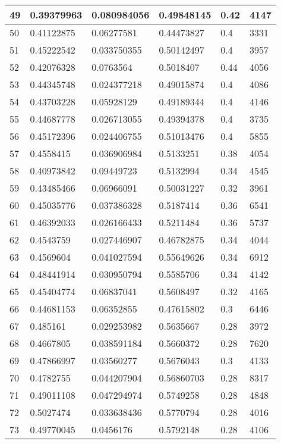 \begin{longtable}{|l|l|l|l|l|l|}
49 & 0.39379963 & 0.080984056 & 0.49848145 & 0.42 & 4147 \\ \hline 
50 & 0.41122875 & 0.06277581 & 0.44473827 & 0.4 & 3331 \\ \hline 
51 & 0.45222542 & 0.033750355 & 0.50142497 & 0.4 & 3957 \\ \hline 
52 & 0.42076328 & 0.0763564 & 0.5018407 & 0.44 & 4056 \\ \hline 
53 & 0.44345748 & 0.024377218 & 0.49015874 & 0.4 & 4086 \\ \hline 
54 & 0.43703228 & 0.05928129 & 0.49189344 & 0.4 & 4146 \\ \hline 
55 & 0.44687778 & 0.026713055 & 0.49394378 & 0.4 & 3735 \\ \hline 
56 & 0.45172396 & 0.024406755 & 0.51013476 & 0.4 & 5855 \\ \hline 
57 & 0.4558415 & 0.036906984 & 0.5133251 & 0.38 & 4054 \\ \hline 
58 & 0.40973842 & 0.09449723 & 0.5132994 & 0.34 & 4545 \\ \hline 
59 & 0.43485466 & 0.06966091 & 0.50031227 & 0.32 & 3961 \\ \hline 
60 & 0.45035776 & 0.037386328 & 0.5187414 & 0.36 & 6541 \\ \hline 
61 & 0.46392033 & 0.026166433 & 0.5211484 & 0.36 & 5737 \\ \hline 
62 & 0.4543759 & 0.027446907 & 0.46782875 & 0.34 & 4044 \\ \hline 
63 & 0.4569604 & 0.041027594 & 0.55649626 & 0.34 & 6912 \\ \hline 
64 & 0.48441914 & 0.030950794 & 0.5585706 & 0.34 & 4142 \\ \hline 
65 & 0.45404774 & 0.06837041 & 0.5608497 & 0.32 & 4165 \\ \hline 
66 & 0.44681153 & 0.06352855 & 0.47615802 & 0.3 & 6446 \\ \hline 
67 & 0.485161 & 0.029253982 & 0.5635667 & 0.28 & 3972 \\ \hline 
68 & 0.4667805 & 0.038591184 & 0.5660372 & 0.28 & 7620 \\ \hline 
69 & 0.47866997 & 0.03560277 & 0.5676043 & 0.3 & 4133 \\ \hline 
70 & 0.4782755 & 0.044207904 & 0.56860703 & 0.28 & 8317 \\ \hline 
71 & 0.49011108 & 0.047294974 & 0.5749258 & 0.28 & 4848 \\ \hline 
72 & 0.5027474 & 0.033638436 & 0.5770794 & 0.28 & 4016 \\ \hline 
73 & 0.49770045 & 0.0456176 & 0.5792148 & 0.28 & 4106 \\ \hline 

\end{longtable}
